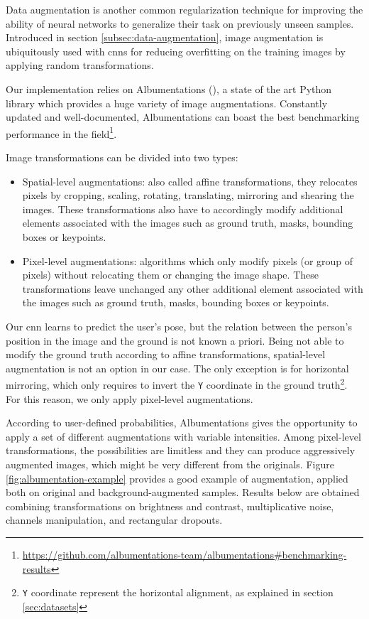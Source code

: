 Data augmentation is another common regularization technique for improving the ability of neural networks to generalize their task on previously unseen samples. Introduced in section \ref{subsec:data-augmentation}, image augmentation is ubiquitously used with \gls{cnn}s for reducing overfitting on the training images by applying random transformations.

Our implementation relies on Albumentations (\cite{Buslaev_2020}), a state of the art Python library which provides a huge variety of image augmentations. Constantly updated and well-documented, Albumentations can boast the best benchmarking performance in the field\footnote{\url{https://github.com/albumentations-team/albumentations\#benchmarking-results}}.

\medskip

Image transformations can be divided into two types:
\begin{itemize}
	\item Spatial-level augmentations: also called affine transformations, they relocates pixels by cropping, scaling, rotating, translating, mirroring and shearing the images. These transformations also have to accordingly modify additional elements associated with the images such as ground truth, masks, bounding boxes or keypoints.
	\item Pixel-level augmentations: algorithms which only modify pixels (or group of pixels) without relocating them or changing the image shape. These transformations leave unchanged any other additional element associated with the images such as ground truth, masks, bounding boxes or keypoints.
\end{itemize}
Our \gls{cnn} learns to predict the user's pose, but the relation between the person's position in the image and the ground is not known a priori. Being not able to modify the ground truth according to affine transformations, spatial-level augmentation is not an option in our case. The only exception is for horizontal mirroring, which only requires to invert the \texttt{Y} coordinate in the ground truth\footnote{\texttt{Y} coordinate represent the horizontal alignment, as explained in section \ref{sec:datasets}}. For this reason, we only apply pixel-level augmentations.

\medskip

According to user-defined probabilities, Albumentations gives the opportunity to apply a set of different augmentations with variable intensities. Among pixel-level transformations, the possibilities are limitless and they can produce aggressively augmented images, which might be very different from the originals. Figure \ref{fig:albumentation-example} provides a good example of augmentation, applied both on original and background-augmented samples. Results below are obtained combining transformations on brightness and contrast, multiplicative noise, channels manipulation, and rectangular dropouts.

